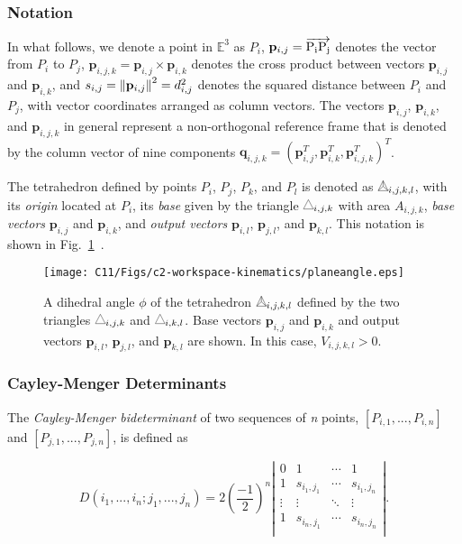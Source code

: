 \subsubsection{Notation}
In what follows, we denote a point in $\mathbb{E}^3$ as $P_i$, $\mathbf{p}_{i,j}=\overrightarrow{\rm P_iP_j}$ denotes the vector from $P_i$ to $P_j$, $\mathbf{p}_{i,j,k}=\mathbf{p}_{i,j}\times\mathbf{p}_{i,k}$ denotes the cross product between vectors $\mathbf{p}_{i,j}$ and $\mathbf{p}_{i,k}$, and $s_{i,j}=\norm{\mathbf{p}_{i,j}}^2=d_{i,j}^2$ denotes the squared distance between $P_i$ and $P_j$, with vector coordinates arranged as column vectors. The vectors $\mathbf{p}_{i,j}$, $\mathbf{p}_{i,k}$, and $\mathbf{p}_{i,j,k}$ in general represent a non-orthogonal reference frame that is denoted by the column vector of nine components $\mathbf{q}_{i,j,k}=(\mathbf{p}_{i,j}^T, \mathbf{p}_{i,k}^T, \mathbf{p}_{i,j,k}^T)^T$.

The tetrahedron defined by points $P_i$, $P_j$, $P_k$, and $P_l$ is denoted as $\pppp_{i,j,k,l}$, with its \textit{origin} located at $P_i$, its \textit{base} given by the triangle $\ppp_{i,j,k}$ with area $A_{i,j,k}$, \textit{base vectors} $\mathbf{p}_{i,j}$ and $\mathbf{p}_{i,k}$, and \textit{output vectors} $\mathbf{p}_{i,l}$, $\mathbf{p}_{j,l}$, and $\mathbf{p}_{k,l}$. This notation is shown in Fig.~\ref{planeangle}~\cite{rojas2017distance, rojas2018forward}.

\begin{figure}[t!]
    \centering
    \texttt{[image: C11/Figs/c2-workspace-kinematics/planeangle.eps]}
    \caption{A dihedral angle $\phi$ of the tetrahedron $\pppp_{i,j,k,l}$ defined by the two triangles $\ppp_{i,j,k}$ and $\ppp_{i,k,l}$. Base vectors $\mathbf{p}_{i,j}$ and $\mathbf{p}_{i,k}$ and output vectors $\mathbf{p}_{i,l}$, $\mathbf{p}_{j,l}$, and $\mathbf{p}_{k,l}$ are shown. In this case, $V_{i,j,k,l}>0$.}
    \label{planeangle}
\end{figure}

\subsubsection{Cayley-Menger Determinants}
The \textit{Cayley-Menger bideterminant} of two sequences of \textit{n} points, $[P_{i,1},...,P_{i,n}]$ and $[P_{j,1},...,P_{j,n}]$, is defined as \cite{rojas-thesis}

\small
\begin{equation*}
    D(i_1,...,i_n;j_1,...,j_n)=2\left(\frac{-1}{2}\right)^n\left| \begin{array}{cccc}
                0       &   1               & \cdots    & 1             \\
                1       &   s_{i_1,j_1}     & \cdots    & s_{i_1,j_n}   \\
                \vdots  &   \vdots          & \ddots    & \vdots        \\
                1       &   s_{i_n,j_1}     & \cdots    & s_{i_n,j_n}   \\
                \end{array} \right|.
\end{equation*}
\normalsize


